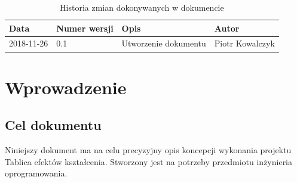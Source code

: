 \documentclass{article}
\begin{document}
\begin{titlepage}







\end{titlepage}

\addtocounter{page}{1}
\newpage

\begin{table}[h!]
	\begin{center}
		\caption{Historia zmian dokonywanych w dokumencie}
		\begin{tabular}{|l|l|l|l|}
			\hline
			Data & Numer wersji & Opis & Autor \\
		  \hline \hline
      2018-11-26 & 0.1 & Utworzenie dokumentu & Piotr Kowalczyk \\
      \hline
    \end{tabular}
	\end{center}
\end{table}	

\tableofcontents

\newpage


\section{Wprowadzenie}

\subsection{Cel dokumentu}
Niniejszy dokument ma na celu precyzyjny opis koncepcji wykonania projektu Tablica efektów kształcenia. Stworzony jest na potrzeby przedmiotu inżynieria oprogramowania.
\end{document}
